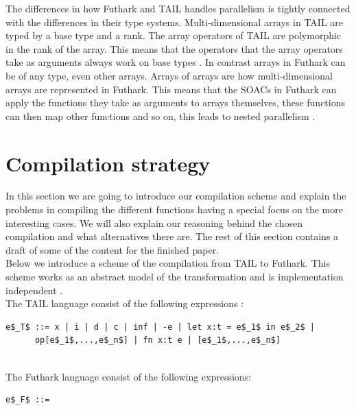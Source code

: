 \documentclass[11pt]{article}
\begin{document}
The differences in how Futhark and TAIL handles parallelism is tightly connected with the differences in their type systems.
Multi-dimensional arrays in TAIL are typed by a base type and a rank. The array operators of TAIL are polymorphic in the rank
of the array. This means that the operators that the array operators take as arguments always work on base types \cite{ElsmanDybdal:Array:2014}. In contrast
arrays in Futhark can be of any type, even other arrays. Arrays of arrays are how multi-dimensional arrays are represented in Futhark.
This means that the SOACs in Futhark can apply the functions they take as arguments to arrays themselves, these functions can then
map other functions and so on, this leads to nested parallelism \cite{TroelsHenriksen}.

\section{Compilation strategy}
In this section we are going to introduce our compilation scheme and explain the problems in compiling the different functions
having a special focus on the more interesting cases.
We will also explain our reasoning behind the chosen compilation and what alternatives there are.
The rest of this section contains a draft of some of the content for the finished paper.\\

Below we introduce a scheme of the compilation from TAIL to Futhark.
This scheme works as an abstract model of the transformation and is implementation independent \cite{MartinElsmanNotation}. \\

The TAIL language consist of the following expressions \cite{ElsmanDybdal:Array:2014}: 

\begin{lstlisting}[numbers=none,frame=none]
e$_T$ ::= x | i | d | c | inf | -e | let x:t = e$_1$ in e$_2$ |
      op[e$_1$,...,e$_n$] | fn x:t e | [e$_1$,...,e$_n$]
      
\end{lstlisting}

The Futhark language consist of the following expressions\cite{TroelsHenriksen}: 
\begin{lstlisting}[numbers=none,frame=none]
e$_F$ ::= 
      
\end{lstlisting}
\end{document}
